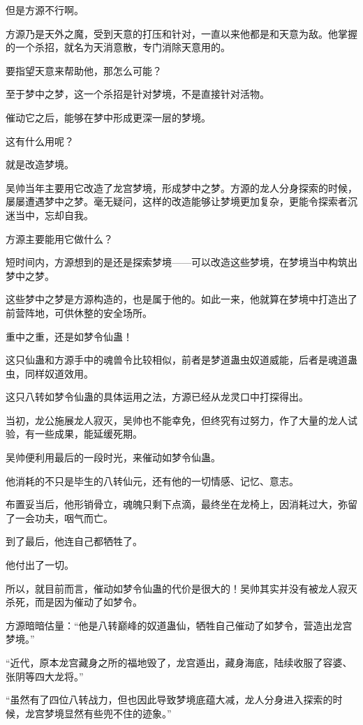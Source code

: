 \begin{this_body}
但是方源不行啊。

方源乃是天外之魔，受到天意的打压和针对，一直以来他都是和天意为敌。他掌握的一个杀招，就名为天消意散，专门消除天意用的。

要指望天意来帮助他，那怎么可能？

至于梦中之梦，这一个杀招是针对梦境，不是直接针对活物。

催动它之后，能够在梦中形成更深一层的梦境。

这有什么用呢？

就是改造梦境。

吴帅当年主要用它改造了龙宫梦境，形成梦中之梦。方源的龙人分身探索的时候，屡屡遭遇梦中之梦。毫无疑问，这样的改造能够让梦境更加复杂，更能令探索者沉迷当中，忘却自我。

方源主要能用它做什么？

短时间内，方源想到的是还是探索梦境——可以改造这些梦境，在梦境当中构筑出梦中之梦。

这些梦中之梦是方源构造的，也是属于他的。如此一来，他就算在梦境中打造出了前营阵地，可供休整的安全场所。

重中之重，还是如梦令仙蛊！

这只仙蛊和方源手中的魂兽令比较相似，前者是梦道蛊虫奴道威能，后者是魂道蛊虫，同样奴道效用。

这只八转如梦令仙蛊的具体运用之法，方源已经从龙灵口中打探得出。

当初，龙公施展龙人寂灭，吴帅也不能幸免，但终究有过努力，作了大量的龙人试验，有一些成果，能延缓死期。

吴帅便利用最后的一段时光，来催动如梦令仙蛊。

他消耗的不只是毕生的八转仙元，还有他的一切情感、记忆、意志。

布置妥当后，他形销骨立，魂魄只剩下点滴，最终坐在龙椅上，因消耗过大，弥留了一会功夫，咽气而亡。

到了最后，他连自己都牺牲了。

他付出了一切。

所以，就目前而言，催动如梦令仙蛊的代价是很大的！吴帅其实并没有被龙人寂灭杀死，而是因为催动了如梦令。

方源暗暗估量：“他是八转巅峰的奴道蛊仙，牺牲自己催动了如梦令，营造出龙宫梦境。”

“近代，原本龙宫藏身之所的福地毁了，龙宫遁出，藏身海底，陆续收服了容婆、张阴等四大龙将。”

“虽然有了四位八转战力，但也因此导致梦境底蕴大减，龙人分身进入探索的时候，龙宫梦境显然有些兜不住的迹象。”


\end{this_body}
